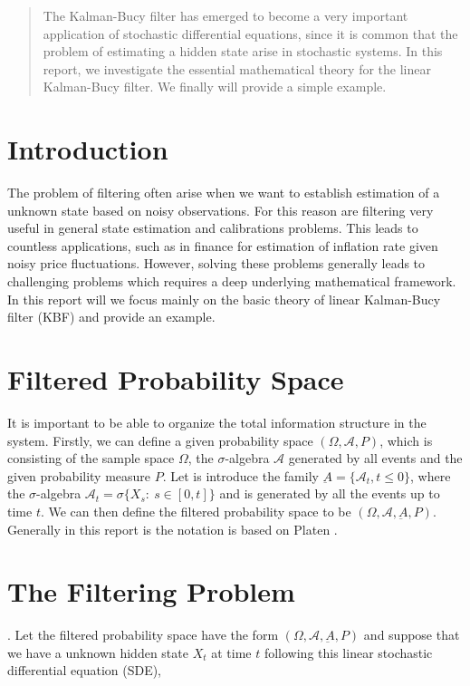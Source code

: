 \begin{abstract}
    The Kalman-Bucy filter has emerged to become a very important application of stochastic differential equations, since it is common that the problem of estimating a hidden state arise in stochastic systems. In this report, we investigate the essential mathematical theory for the linear Kalman-Bucy filter.  We finally will provide a simple example.
\end{abstract}

\section{Introduction }
 The problem of filtering often arise when we want to establish estimation of a unknown state based on noisy observations. For this reason are filtering very useful in general state estimation and calibrations problems. This leads to countless applications, such as in finance for estimation of inflation rate given noisy price fluctuations. However, solving these problems generally leads to challenging problems which requires a deep underlying mathematical framework. In this report will we focus mainly on the basic theory of linear Kalman-Bucy filter (KBF) and provide an example.

\section{Filtered Probability Space}
It is important to be able to organize the total information structure in the system. Firstly, we can define a given probability space $(\Omega, \mathcal{A}, P)$, which is consisting of the sample space $\Omega$, the $\sigma$-algebra $\mathcal{A}$ generated by all events and the given probability measure $P$.
Let is introduce the family $\underbar A=\{ \mathcal{A}_t, t \le 0 \}$,
where the $\sigma$-algebra $\mathcal{A}_t  = \sigma  \{ X_s: \ s \in [ 0, t ] \}$ and is generated by all the events up to time $t$. We can then define the filtered probability space to be
$(\Omega, \mathcal{A}, \underbar{A}, P)$.
Generally in this report is the notation is based on Platen \cite{PlatBrut10}.

\section{The Filtering Problem}.
Let the filtered probability space have the form $(\Omega, \mathcal{A}, \underbar{A}, P)$ and suppose that we have a unknown hidden state $X_t$ at time $t$ following this linear stochastic differential equation (SDE),


